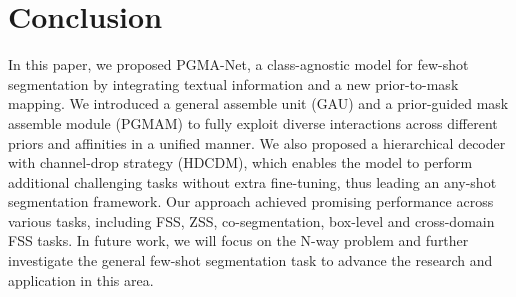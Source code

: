 \documentclass[lettersize,journal]{IEEEtran}
\begin{document}
 \section{Conclusion}

In this paper, we proposed PGMA-Net, a class-agnostic model for few-shot segmentation by integrating textual information and a new prior-to-mask mapping. We introduced a general assemble unit (GAU) and a prior-guided mask assemble module (PGMAM) to fully exploit diverse interactions across different priors and affinities in a unified manner. We also proposed a hierarchical decoder with channel-drop strategy (HDCDM), which enables the model to perform additional challenging tasks without extra fine-tuning, thus leading an any-shot segmentation framework. Our approach achieved promising performance across various tasks, including FSS, ZSS, co-segmentation, box-level and cross-domain FSS tasks. In future work, we will focus on the N-way problem and further investigate the general few-shot segmentation task to advance the research and application in this area. 

{\small


}
\end{document}
